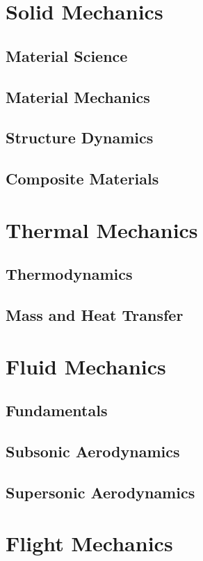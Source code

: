 
\chapter{Solid Mechanics}

\section{Material Science}
\section{Material Mechanics}
\section{Structure Dynamics}
\section{Composite Materials}

\chapter{Thermal Mechanics}

\section{Thermodynamics}
\section{Mass and Heat Transfer}

\chapter{Fluid Mechanics}

\section{Fundamentals}
\section{Subsonic Aerodynamics}
\section{Supersonic Aerodynamics}

\chapter{Flight Mechanics}

